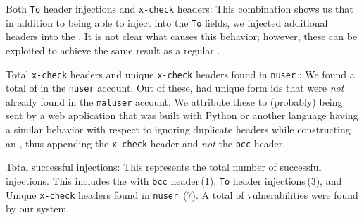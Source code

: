 Both \texttt{To} header injections and \texttt{x-check} headers: This
combination shows us that in addition to being able to inject into the
\texttt{To} fields, we injected additional headers into the \email. It
is not clear what causes this behavior; however, these can be
exploited to achieve the same result as a regular \ehi.
	
Total \texttt{x-check} headers and unique \texttt{x-check} headers
found in \texttt{nuser} \emails: We found a total of \ehinuserxcheck
\emails in the \texttt{nuser} account. Out of these,
\ehiuniquenuserxcheck had unique form ids that were \emph{not} already
found in the \texttt{maluser} account. We attribute these \emails to
(probably) being sent by a web application that was built with Python
or another language having a similar behavior with respect to ignoring
duplicate headers while constructing an \email, thus appending the
\texttt{x-check} header and \emph{not} the \texttt{bcc} header.
	
Total successful injections: This represents the total number of
successful injections. This includes the \ehi with \texttt{bcc}
header\,(1), \texttt{To} header injections\,(3), and Unique
\texttt{x-check} headers found in \texttt{nuser} \emails\,(7). A total
of \success vulnerabilities were found by our system.


